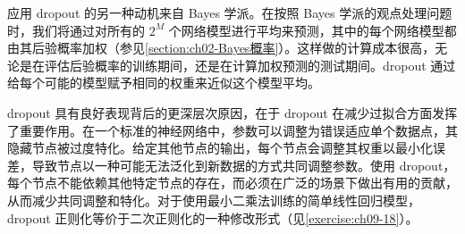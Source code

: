 \documentclass[../../main.tex]{subfiles}
\begin{document}
应用 dropout 的另一种动机来自 Bayes 学派。在按照 Bayes 学派的观点处理问题时，我们将通过对所有的 $2^{M}$ 个网络模型进行平均来预测，其中的每个网络模型都由其后验概率加权（参见\cref{section:ch02-Bayes概率}）。这样做的计算成本很高，无论是在评估后验概率的训练期间，还是在计算加权预测的测试期间。dropout 通过给每个可能的模型赋予相同的权重来近似这个模型平均。

dropout 具有良好表现背后的更深层次原因，在于 dropout 在减少过拟合方面发挥了重要作用。在一个标准的神经网络中，参数可以调整为错误适应单个数据点，其隐藏节点被过度特化。给定其他节点的输出，每个节点会调整其权重以最小化误差，导致节点以一种可能无法泛化到新数据的方式共同调整参数。使用 dropout，每个节点不能依赖其他特定节点的存在，而必须在广泛的场景下做出有用的贡献，从而减少共同调整和特化。对于使用最小二乘法训练的简单线性回归模型，dropout 正则化等价于二次正则化的一种修改形式（见\cref{exercise:ch09-18}）。
\end{document}
